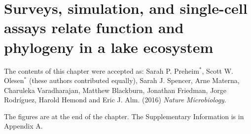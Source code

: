 \chapter{Surveys, simulation, and single-cell assays relate function and phylogeny in a lake ecosystem}
\label{ch:lake}

The contents of this chapter were accepted as: 
Sarah P. Preheim$^*$, Scott W. Olesen$^*$ (these authors contributed equally), Sarah J. Spencer, Arne Materna,
Charuleka Varadharajan, Matthew Blackburn, Jonathan Friedman, Jorge
Rodr\'{i}guez, Harold Hemond and Eric J. Alm.
(2016) \textit{Nature Microbiology}.

The figures are at the end of the chapter. The Supplementary Information is in Appendix A.



